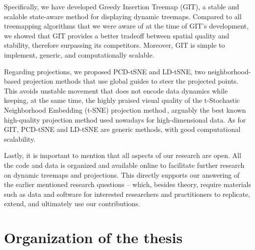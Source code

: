 Specifically, we have developed Greedy Insertion Treemap (GIT), a stable and scalable state-aware method for displaying dynamic treemaps. Compared to all treemapping algorithms that we were aware of at the time of GIT's development, we showed that GIT provides a better tradeoff between spatial quality and stability, therefore surpassing its competitors. Moreover, GIT is simple to implement, generic, and computationally scalable.

Regarding projections, we proposed PCD-tSNE and LD-tSNE, two neighborhood-based projection methods that use global guides to steer the projected points. This avoids unstable movement that does not encode data dynamics while keeping, at the same time, the highly praised visual quality of the t-Stochastic Neighborhood Embedding (t-SNE) projection method\,\cite{tsne}, arguably the best known high-quality projection method used nowadays for high-dimensional data. As for GIT, PCD-tSNE and LD-tSNE are generic methods, with good computational scalability.

\bigbreak

Lastly, it is important to mention that all aspects of our research are open. All the code and data is organized and available online to facilitate further research on dynamic treemaps and projections. This directly supports our answering of the earlier mentioned research questions -- which, besides theory, require materials such as data and software for interested researchers and practitioners to replicate, extend, and ultimately use our contributions.

\section{Organization of the thesis}






